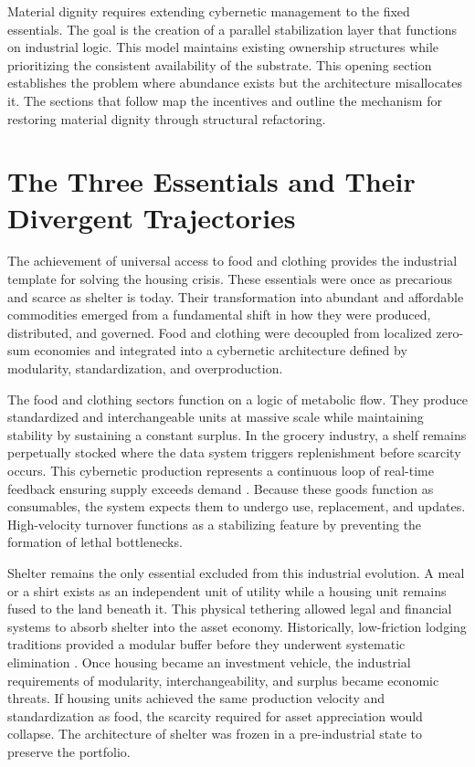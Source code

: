 \documentclass[12pt, letterpaper]{article}
\begin{document}
Material dignity requires extending cybernetic management to the fixed essentials. The goal is the creation of a parallel stabilization layer that functions on industrial logic. This model maintains existing ownership structures while prioritizing the consistent availability of the substrate. This opening section establishes the problem where abundance exists but the architecture misallocates it. The sections that follow map the incentives and outline the mechanism for restoring material dignity through structural refactoring.

\section{The Three Essentials and Their Divergent Trajectories}

The achievement of universal access to food and clothing provides the industrial template for solving the housing crisis. These essentials were once as precarious and scarce as shelter is today. Their transformation into abundant and affordable commodities emerged from a fundamental shift in how they were produced, distributed, and governed. Food and clothing were decoupled from localized zero-sum economies and integrated into a cybernetic architecture defined by modularity, standardization, and overproduction.

The food and clothing sectors function on a logic of metabolic flow. They produce standardized and interchangeable units at massive scale while maintaining stability by sustaining a constant surplus. In the grocery industry, a shelf remains perpetually stocked where the data system triggers replenishment before scarcity occurs. This cybernetic production represents a continuous loop of real-time feedback ensuring supply exceeds demand \citep{beer_1972, beer_1981, ashby_1956, wiener_1948}. Because these goods function as consumables, the system expects them to undergo use, replacement, and updates. High-velocity turnover functions as a stabilizing feature by preventing the formation of lethal bottlenecks.

Shelter remains the only essential excluded from this industrial evolution. A meal or a shirt exists as an independent unit of utility while a housing unit remains fused to the land beneath it. This physical tethering allowed legal and financial systems to absorb shelter into the asset economy. Historically, low-friction lodging traditions provided a modular buffer before they underwent systematic elimination \citep{groth_1994}. Once housing became an investment vehicle, the industrial requirements of modularity, interchangeability, and surplus became economic threats. If housing units achieved the same production velocity and standardization as food, the scarcity required for asset appreciation would collapse. The architecture of shelter was frozen in a pre-industrial state to preserve the portfolio.
\end{document}
